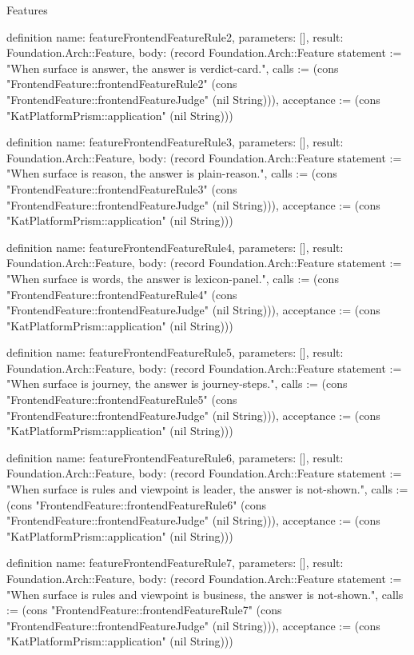 \begin{lexlean}{Features}
\begin{semanticmodule}
definition{
  name: featureFrontendFeatureRule2,
  parameters: [],
  result: Foundation.Arch::Feature,
  body: (record Foundation.Arch::Feature {statement := "When surface is answer, the answer is verdict-card.", calls := (cons "FrontendFeature::frontendFeatureRule2" (cons "FrontendFeature::frontendFeatureJudge" (nil String))), acceptance := (cons "KatPlatformPrism::application" (nil String))})
}

definition{
  name: featureFrontendFeatureRule3,
  parameters: [],
  result: Foundation.Arch::Feature,
  body: (record Foundation.Arch::Feature {statement := "When surface is reason, the answer is plain-reason.", calls := (cons "FrontendFeature::frontendFeatureRule3" (cons "FrontendFeature::frontendFeatureJudge" (nil String))), acceptance := (cons "KatPlatformPrism::application" (nil String))})
}

definition{
  name: featureFrontendFeatureRule4,
  parameters: [],
  result: Foundation.Arch::Feature,
  body: (record Foundation.Arch::Feature {statement := "When surface is words, the answer is lexicon-panel.", calls := (cons "FrontendFeature::frontendFeatureRule4" (cons "FrontendFeature::frontendFeatureJudge" (nil String))), acceptance := (cons "KatPlatformPrism::application" (nil String))})
}

definition{
  name: featureFrontendFeatureRule5,
  parameters: [],
  result: Foundation.Arch::Feature,
  body: (record Foundation.Arch::Feature {statement := "When surface is journey, the answer is journey-steps.", calls := (cons "FrontendFeature::frontendFeatureRule5" (cons "FrontendFeature::frontendFeatureJudge" (nil String))), acceptance := (cons "KatPlatformPrism::application" (nil String))})
}

definition{
  name: featureFrontendFeatureRule6,
  parameters: [],
  result: Foundation.Arch::Feature,
  body: (record Foundation.Arch::Feature {statement := "When surface is rules and viewpoint is leader, the answer is not-shown.", calls := (cons "FrontendFeature::frontendFeatureRule6" (cons "FrontendFeature::frontendFeatureJudge" (nil String))), acceptance := (cons "KatPlatformPrism::application" (nil String))})
}

definition{
  name: featureFrontendFeatureRule7,
  parameters: [],
  result: Foundation.Arch::Feature,
  body: (record Foundation.Arch::Feature {statement := "When surface is rules and viewpoint is business, the answer is not-shown.", calls := (cons "FrontendFeature::frontendFeatureRule7" (cons "FrontendFeature::frontendFeatureJudge" (nil String))), acceptance := (cons "KatPlatformPrism::application" (nil String))})
}


\end{semanticmodule}
\end{lexlean}
